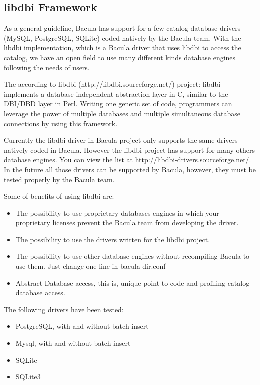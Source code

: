 \subsection{libdbi Framework}
As a general guideline, Bacula has support for a few catalog database drivers
(MySQL, PostgreSQL, SQLite)
coded natively by the Bacula team.  With the libdbi implementation, which is a
Bacula driver that uses libdbi to access the catalog, we have an open field to
use many different kinds database engines following the needs of users.

The according to libdbi (http://libdbi.sourceforge.net/) project: libdbi
implements a database-independent abstraction layer in C, similar to the
DBI/DBD layer in Perl. Writing one generic set of code, programmers can
leverage the power of multiple databases and multiple simultaneous database
connections by using this framework.

Currently the libdbi driver in Bacula project only supports the same drivers
natively coded in Bacula.  However the libdbi project has support for many
others database engines. You can view the list at
http://libdbi-drivers.sourceforge.net/. In the future all those drivers can be
supported by Bacula, however, they must be tested properly by the Bacula team.

Some of benefits of using libdbi are:
\begin{itemize}
\item The possibility to use proprietary databases engines in which your
  proprietary licenses prevent the Bacula team from developing the driver.
 \item The possibility to use the drivers written for the libdbi project.
 \item The possibility to use other database engines without recompiling Bacula
   to use them.  Just change one line in bacula-dir.conf
 \item Abstract Database access, this is, unique point to code and profiling
   catalog database access.
 \end{itemize}
 
 The following drivers have been tested:
 \begin{itemize}
 \item PostgreSQL, with and without batch insert
 \item Mysql, with and without batch insert
 \item SQLite
 \item SQLite3
 \end{itemize}

